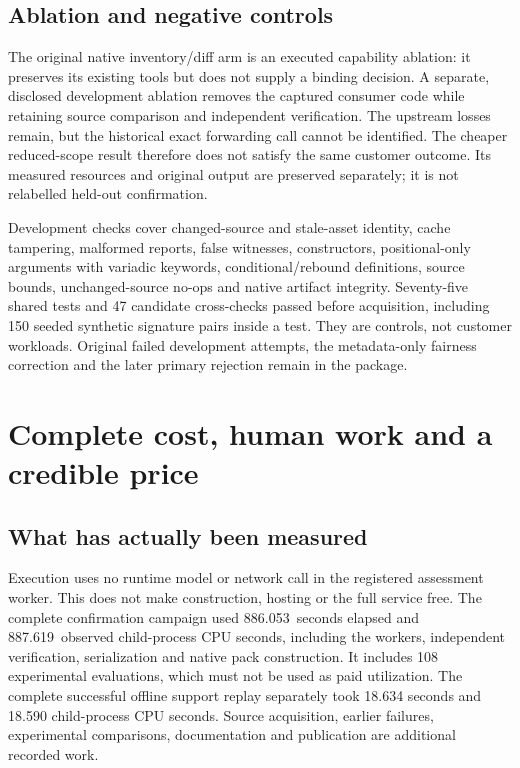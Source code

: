 \documentclass[11pt,letterpaper]{article}
\newcommand{\CampaignWall}{886.053}
\newcommand{\CampaignCPU}{887.619}
\begin{document}
\subsection{Ablation and negative controls}
The original native inventory/diff arm is an executed capability ablation: it preserves its existing tools but does not supply a binding decision. A separate, disclosed development ablation removes the captured consumer code while retaining source comparison and independent verification. The upstream losses remain, but the historical exact forwarding call cannot be identified. The cheaper reduced-scope result therefore does not satisfy the same customer outcome. Its measured resources and original output are preserved separately; it is not relabelled held-out confirmation.

Development checks cover changed-source and stale-asset identity, cache tampering, malformed reports, false witnesses, constructors, positional-only arguments with variadic keywords, conditional/rebound definitions, source bounds, unchanged-source no-ops and native artifact integrity. Seventy-five shared tests and 47 candidate cross-checks passed before acquisition, including 150 seeded synthetic signature pairs inside a test. They are controls, not customer workloads. Original failed development attempts, the metadata-only fairness correction and the later primary rejection remain in the package.

\section{Complete cost, human work and a credible price}
\subsection{What has actually been measured}
Execution uses no runtime model or network call in the registered assessment worker. This does not make construction, hosting or the full service free. The complete confirmation campaign used \CampaignWall\ seconds elapsed and \CampaignCPU\ observed child-process CPU seconds, including the workers, independent verification, serialization and native pack construction. It includes 108 experimental evaluations, which must not be used as paid utilization. The complete successful offline support replay separately took 18.634 seconds and 18.590 child-process CPU seconds. Source acquisition, earlier failures, experimental comparisons, documentation and publication are additional recorded work.
\end{document}

